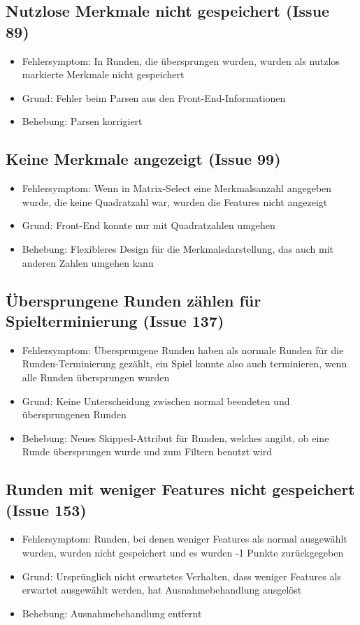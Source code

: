 \documentclass[a4paper]{scrreprt}
\begin{document}
    \subsection{Nutzlose Merkmale nicht gespeichert (Issue 89)}
    \begin{itemize}
    \item Fehlersymptom: In Runden, die übersprungen wurden, wurden als nutzlos
     markierte Merkmale nicht gespeichert
    \item Grund: Fehler beim Parsen aus den Front-End-Informationen
    \item Behebung: Parsen korrigiert
    \end{itemize}

    \subsection{Keine Merkmale angezeigt (Issue 99)}
    \begin{itemize}
    \item Fehlersymptom: Wenn in Matrix-Select eine Merkmalsanzahl angegeben wurde,
    die keine Quadratzahl war, wurden die Features nicht angezeigt
    \item Grund: Front-End konnte nur mit Quadratzahlen umgehen
    \item Behebung: Flexibleres Design für die Merkmalsdarstellung, das auch mit anderen
     Zahlen umgehen kann
    \end{itemize}

    \subsection{Übersprungene Runden zählen für Spielterminierung (Issue 137)}
    \begin{itemize}
    \item Fehlersymptom: Übersprungene Runden haben als normale Runden für die
     Runden-Terminierung gezählt, ein Spiel konnte also auch terminieren, wenn alle
      Runden übersprungen wurden
    \item Grund: Keine Unterscheidung zwischen normal beendeten und übersprungenen
     Runden 
    \item Behebung: Neues Skipped-Attribut für Runden, welches angibt, ob eine
     Runde übersprungen wurde und zum Filtern benutzt wird
    \end{itemize}

    \subsection{Runden mit weniger Features nicht gespeichert (Issue 153)}
    \begin{itemize}
    \item Fehlersymptom: Runden, bei denen weniger Features als normal ausgewählt
     wurden, wurden nicht gespeichert und es wurden -1 Punkte zurückgegeben
    \item Grund: Ursprünglich nicht erwartetes Verhalten, dass weniger Features
     als erwartet ausgewählt werden, hat Ausnahmebehandlung ausgelöst
    \item Behebung: Ausnahmebehandlung entfernt
    \end{itemize}
\end{document}
